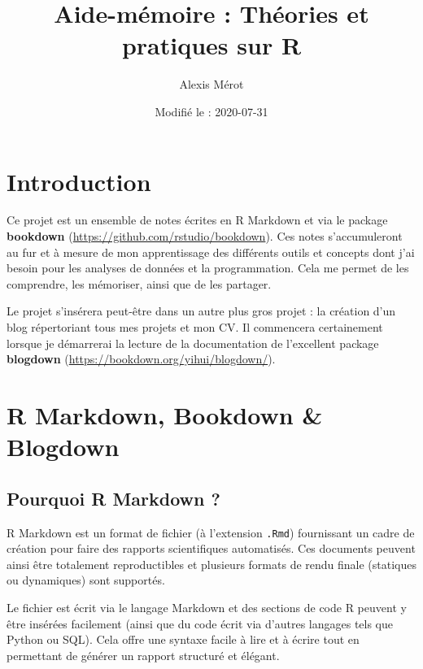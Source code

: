 \documentclass[
]{book}
\title{Aide-mémoire : Théories et pratiques sur R}
\author{Alexis Mérot}
\date{Modifié le : 2020-07-31}
\begin{document}
\maketitle

{
\setcounter{tocdepth}{1}
\tableofcontents
}
\hypertarget{introduction}{%
\chapter*{Introduction}\label{introduction}}

Ce projet est un ensemble de notes écrites en R Markdown \autocite{R-rmarkdown} et via
le package \textbf{bookdown} (\url{https://github.com/rstudio/bookdown}). Ces notes
s'accumuleront au fur et à mesure de mon apprentissage des différents outils et
concepts dont j'ai besoin pour les analyses de données et la programmation. Cela
me permet de les comprendre, les mémoriser, ainsi que de les partager.

Le projet s'insérera peut-être dans un autre plus gros projet : la création d'un
blog répertoriant tous mes projets et mon CV. Il commencera certainement lorsque
je démarrerai la lecture de la documentation de l'excellent package \textbf{blogdown}
(\url{https://bookdown.org/yihui/blogdown/}).

\hypertarget{rmarkdown}{%
\chapter{R Markdown, Bookdown \& Blogdown}\label{rmarkdown}}

\hypertarget{pourquoi-rmarkdown}{%
\section{Pourquoi R Markdown ?}\label{pourquoi-rmarkdown}}

R Markdown est un format de fichier (à l'extension \texttt{.Rmd}) fournissant un cadre
de création pour faire des rapports scientifiques automatisés. Ces documents
peuvent ainsi être totalement reproductibles et plusieurs formats de rendu
finale (statiques ou dynamiques) sont supportés.

Le fichier est écrit via le langage Markdown et des sections de code R peuvent y
être insérées facilement (ainsi que du code écrit via d'autres langages tels
que Python ou SQL). Cela offre une syntaxe facile à lire et à écrire tout en
permettant de générer un rapport structuré et élégant.
\end{document}
